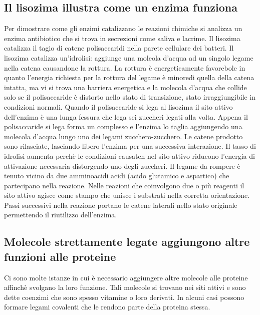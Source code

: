 \subsection{Il lisozima illustra come un enzima funziona}
Per dimostrare come gli enzimi catalizzano le reazioni chimiche si analizza un enzima antibiotico che si trova in secrezioni come saliva e lacrime. Il lisozima catalizza il tagio di 
catene polisaccaridi nella parete cellulare dei batteri. Il lisozima catalizza un'idrolisi: aggiunge una moleola d'acqua ad un singolo legame nella catena causandone la rottura. La 
rottura \`e energeticamente favorebole in quanto l'energia richiesta per la rottura del legame \`e minoredi quella della catena intatta, ma vi si trova una barriera energetica e la
molecola d'acqua che collide solo se il polisaccaride \`e distorto nello stato di transizione, stato irraggiungibile in condizioni normali. Quando il polisaccaride si lega al lisozima 
il sito attivo dell'enzima \`e una lunga fessura che lega sei zuccheri legati alla volta. Appena il polisaccaride si lega forma un complesso e l'enzima lo taglia aggiungendo una 
molecola d'acqua lungo uno dei legami zucchero-zucchero. Le catene prodotto sono rilasciate, lasciando libero l'enzima per una successiva interazione. Il tasso di idrolisi aumenta 
perch\`e le condizioni causaten nel sito attivo riducono l'energia di attivazione necessaria distorgendo uno degli zuccheri. Il legame da rompere \`e tenuto vicino da due amminoacidi
acidi (acido glutamico e aspartico) che partecipano nella reazione. Nelle reazioni che coinvolgono due o pi\`u reagenti il sito attivo agisce come stampo che unisce i substrati nella
corretta orientazione. Passi successivi nella reazione portano le catene laterali nello stato originale permettendo il riutilizzo dell'enzima.
\subsection{Molecole strettamente legate aggiungono altre funzioni alle proteine}
Ci sono molte istanze in cui \`e necessario aggiungere altre molecole alle proteine affinch\`e svolgano la loro funzione. Tali molecole si trovano nei siti attivi e sono dette 
coenzimi che sono spesso vitamine o loro derivati. In alcuni casi possono formare legami covalenti che le rendono parte della proteina stessa.
